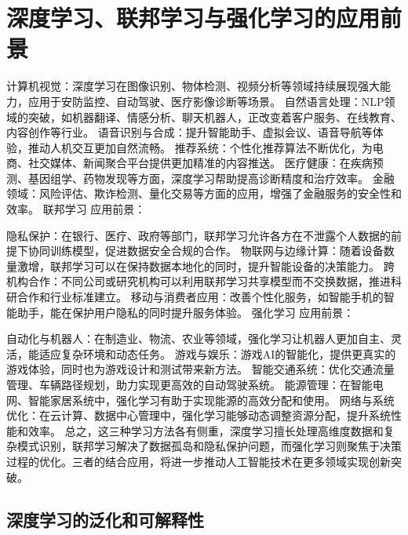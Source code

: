 \chapter{深度学习、联邦学习与强化学习的应用前景}\label{chap:Third}


计算机视觉：深度学习在图像识别、物体检测、视频分析等领域持续展现强大能力，应用于安防监控、自动驾驶、医疗影像诊断等场景。
自然语言处理：NLP领域的突破，如机器翻译、情感分析、聊天机器人，正改变着客户服务、在线教育、内容创作等行业。
语音识别与合成：提升智能助手、虚拟会议、语音导航等体验，推动人机交互更加自然流畅。
推荐系统：个性化推荐算法不断优化，为电商、社交媒体、新闻聚合平台提供更加精准的内容推送。
医疗健康：在疾病预测、基因组学、药物发现等方面，深度学习帮助提高诊断精度和治疗效率。
金融领域：风险评估、欺诈检测、量化交易等方面的应用，增强了金融服务的安全性和效率。
联邦学习
应用前景：

隐私保护：在银行、医疗、政府等部门，联邦学习允许各方在不泄露个人数据的前提下协同训练模型，促进数据安全合规的合作。
物联网与边缘计算：随着设备数量激增，联邦学习可以在保持数据本地化的同时，提升智能设备的决策能力。
跨机构合作：不同公司或研究机构可以利用联邦学习共享模型而不交换数据，推进科研合作和行业标准建立。
移动与消费者应用：改善个性化服务，如智能手机的智能助手，能在保护用户隐私的同时提升服务体验。
强化学习
应用前景：

自动化与机器人：在制造业、物流、农业等领域，强化学习让机器人更加自主、灵活，能适应复杂环境和动态任务。
游戏与娱乐：游戏AI的智能化，提供更真实的游戏体验，同时也为游戏设计和测试带来新方法。
智能交通系统：优化交通流量管理、车辆路径规划，助力实现更高效的自动驾驶系统。
能源管理：在智能电网、智能家居系统中，强化学习有助于实现能源的高效分配和使用。
网络与系统优化：在云计算、数据中心管理中，强化学习能够动态调整资源分配，提升系统性能和效率。
总之，这三种学习方法各有侧重，深度学习擅长处理高维度数据和复杂模式识别，联邦学习解决了数据孤岛和隐私保护问题，而强化学习则聚焦于决策过程的优化。三者的结合应用，将进一步推动人工智能技术在更多领域实现创新突破。

\section{深度学习的泛化和可解释性}
